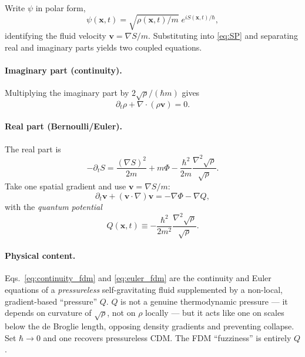 \documentclass[12pt]{article}
\newcommand{\bx}{\mathbf{x}}
\newcommand{\bv}{\mathbf{v}}
\begin{document}
Write $\psi$ in polar form,
%
\begin{equation}
  \psi(\bx,t) = \sqrt{\rho(\bx,t)/m}\;e^{iS(\bx,t)/\hbar},
  \label{eq:madelung_def}
\end{equation}
%
identifying the fluid velocity $\bv = \nabla S/m$.
Substituting into \eqref{eq:SP} and separating real and imaginary
parts yields two coupled equations.

\paragraph{Imaginary part (continuity).}  Multiplying the imaginary
part by $2\sqrt\rho/(\hbar m)$ gives
%
\begin{equation}
  \partial_t\rho + \nabla\!\cdot(\rho\bv) = 0.
  \label{eq:continuity_fdm}
\end{equation}

\paragraph{Real part (Bernoulli/Euler).}  The real part is
%
\begin{equation}
  -\partial_t S = \frac{(\nabla S)^2}{2m} + m\Phi
                  - \frac{\hbar^2}{2m}\frac{\nabla^2\sqrt\rho}{\sqrt\rho}.
\end{equation}
%
Take one spatial gradient and use $\bv=\nabla S/m$:
%
\begin{equation}
  \partial_t\bv + (\bv\cdot\nabla)\bv
    = -\nabla\Phi - \nabla Q,
  \label{eq:euler_fdm}
\end{equation}
%
with the \emph{quantum potential}
%
\begin{equation}
  Q(\bx,t) \equiv -\frac{\hbar^2}{2m^2}
                  \frac{\nabla^2\sqrt\rho}{\sqrt\rho}.
  \label{eq:Q_def}
\end{equation}

\paragraph{Physical content.}  Eqs.~\eqref{eq:continuity_fdm} and
\eqref{eq:euler_fdm} are the continuity and Euler equations of a
\emph{pressureless} self-gravitating fluid supplemented by a
non-local, gradient-based ``pressure'' $Q$.  $Q$ is not a genuine
thermodynamic pressure --- it depends on curvature of $\sqrt\rho$, not
on $\rho$ locally --- but it acts like one on scales below the de
Broglie length, opposing density gradients and preventing collapse.
Set $\hbar\to 0$ and one recovers pressureless CDM.  The FDM
``fuzziness'' is entirely $Q$.
\end{document}
